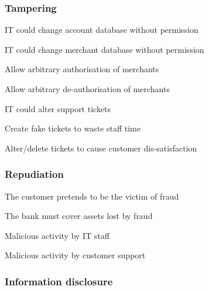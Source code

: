 \subsubsection{Tampering}

\begin{numbered}[resume]

    \item \label{tamperAccountDatabase} IT could change account database without permission

    \item \label{tamperMerchantDatabase} IT could change merchant database without permission
    \begin{numbered}
        \item Allow arbitrary authorisation of merchants
        \item Allow arbitrary de-authorisation of merchants
    \end{numbered}

    \item \label{tamperSupportTickets} IT could alter support tickets
    \begin{numbered}
        \item Create fake tickets to waste staff time
        \item Alter/delete tickets to cause customer dis-satisfaction
    \end{numbered}
\end{numbered}

\subsubsection{Repudiation}

\begin{numbered}[resume]
    \item \label{repudiationFraud} The customer pretends to be the victim of fraud
    \begin{numbered}
        \item The bank must cover assets lost by fraud
    \end{numbered}

    \item \label{repudiationIt} Malicious activity by IT staff
    \item \label{repudiationCustomerSupport} Malicious activity by customer support
\end{numbered}

\subsubsection{Information disclosure}

